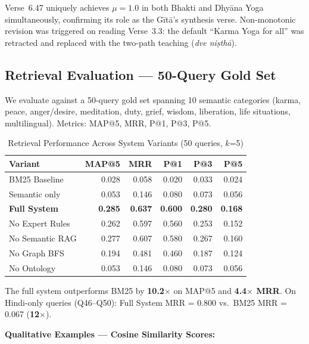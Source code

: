 \documentclass[conference]{IEEEtran}
\begin{document}
Verse~6.47 uniquely achieves $\mu = 1.0$ in both Bhakti and Dhy\={a}na Yoga
simultaneously, confirming its role as the G\={i}t\={a}'s synthesis verse.
Non-monotonic revision was triggered on reading Verse~3.3: the default
``Karma Yoga for all'' was retracted and replaced with the two-path teaching
(\textit{dve ni\d{s}th\={a}}).

\subsection{Retrieval Evaluation — 50-Query Gold Set}

We evaluate against a 50-query gold set spanning 10 semantic categories
(karma, peace, anger/desire, meditation, duty, grief, wisdom, liberation,
life situations, multilingual). Metrics: MAP@5, MRR, P@1, P@3, P@5.

\begin{table}[htbp]
\caption{Retrieval Performance Across System Variants (50 queries, $k$=5)}
\label{tab:retrieval}
\centering
\small
\begin{tabular}{p{3.2cm}rrrrr}
\toprule
\textbf{Variant} & \textbf{MAP@5} & \textbf{MRR} & \textbf{P@1} & \textbf{P@3} & \textbf{P@5} \\
\midrule
BM25 Baseline     & 0.028 & 0.058 & 0.020 & 0.033 & 0.024 \\
Semantic only     & 0.053 & 0.146 & 0.080 & 0.073 & 0.056 \\
\textbf{Full System} & \textbf{0.285} & \textbf{0.637} & \textbf{0.600} & \textbf{0.280} & \textbf{0.168} \\
No Expert Rules   & 0.262 & 0.597 & 0.560 & 0.253 & 0.152 \\
No Semantic RAG   & 0.277 & 0.607 & 0.580 & 0.267 & 0.160 \\
No Graph BFS      & 0.194 & 0.481 & 0.460 & 0.187 & 0.124 \\
No Ontology       & 0.053 & 0.146 & 0.080 & 0.073 & 0.056 \\
\bottomrule
\end{tabular}
\end{table}

The full system outperforms BM25 by \textbf{10.2$\times$} on MAP@5 and
\textbf{4.4$\times$ MRR}. On Hindi-only queries (Q46--Q50): Full System
MRR = 0.800 vs.\ BM25 MRR = 0.067 (\textbf{12$\times$}).

\textbf{Qualitative Examples — Cosine Similarity Scores:}
\end{document}
